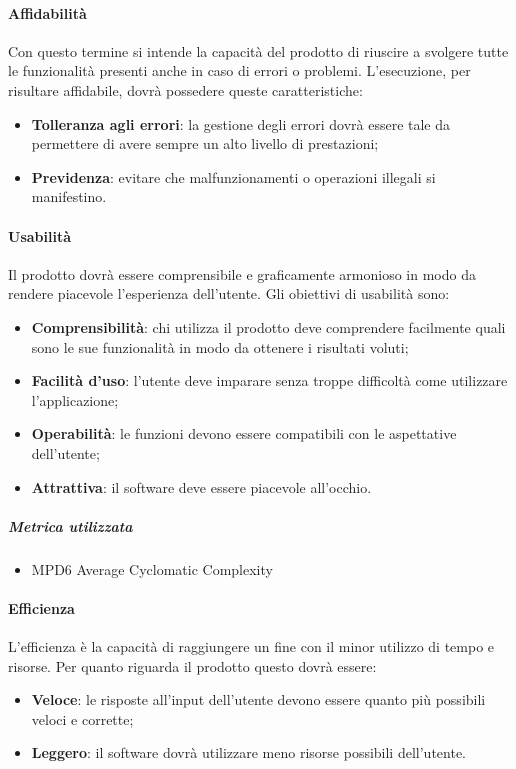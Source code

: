 \paragraph{Affidabilità}
Con questo termine si intende la capacità del prodotto di riuscire a svolgere tutte le funzionalità presenti anche in caso di errori o problemi. L'esecuzione, per risultare affidabile, dovrà possedere queste caratteristiche:
\begin{itemize}
\item \textbf{Tolleranza agli errori}: la gestione degli errori dovrà essere tale da permettere di avere sempre un alto livello di prestazioni;
\item \textbf{Previdenza}: evitare che malfunzionamenti o operazioni illegali si manifestino.
\end{itemize}
\paragraph{Usabilità}
Il prodotto dovrà essere comprensibile e graficamente armonioso in modo da rendere piacevole l'esperienza dell'utente. Gli obiettivi di usabilità sono:
\begin{itemize}
\item \textbf{Comprensibilità}: chi utilizza il prodotto deve comprendere facilmente quali sono le sue funzionalità in modo da ottenere i risultati voluti;
\item \textbf{Facilità d'uso}: l'utente deve imparare senza troppe difficoltà come utilizzare l'applicazione;
\item \textbf{Operabilità}: le funzioni devono essere compatibili con le aspettative dell'utente;
\item \textbf{Attrattiva}: il software deve essere piacevole all'occhio.
\end{itemize} 
\subparagraph{Metrica utilizzata}
\begin{itemize}
\item MPD6 Average Cyclomatic Complexity
\end{itemize}
\paragraph{Efficienza}
L'efficienza è la capacità di raggiungere un fine con il minor utilizzo di tempo e risorse. Per quanto riguarda il prodotto questo dovrà essere:
\begin{itemize}
\item \textbf{Veloce}: le risposte all'input dell'utente devono essere quanto più possibili veloci e corrette;
\item \textbf{Leggero}: il software dovrà utilizzare meno risorse possibili dell'utente.
\end{itemize}
